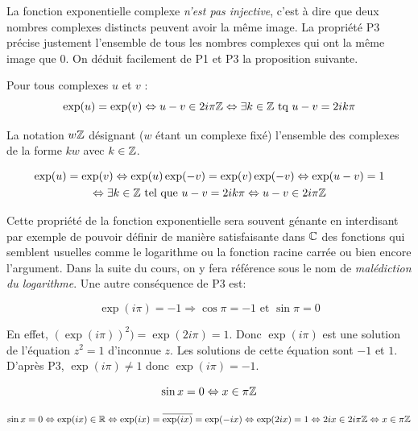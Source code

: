 La fonction exponentielle complexe \emph{n'est pas injective}, c'est à dire que deux nombres complexes distincts peuvent avoir la même image. La propriété P3 précise justement l'ensemble de tous les nombres complexes qui ont la même image que $0$. On déduit facilement de P1 et P3 la proposition suivante. 
\begin{propn}
Pour tous complexes $u$ et $v$ :
\begin{displaymath}
 \exp(u) = \exp (v) \Leftrightarrow u-v \in 2i\pi \mathbb{Z} 
 \Leftrightarrow \exists k \in \mathbb{Z} \text{ tq } u -v = 2ik\pi
\end{displaymath}
\end{propn}
La notation $w\mathbb{Z}$ désignant ($w$ étant un complexe fixé) l'ensemble des complexes de la forme $kw$ avec $k\in \mathbb{Z}$. 
\begin{demo}
\begin{multline*}
 \exp(u) = \exp (v) \Leftrightarrow \exp(u) \exp (-v) = \exp (v) \exp (-v) \Leftrightarrow \exp(u-v) = 1 \\
\Leftrightarrow \exists k \in \mathbb{Z} \text{ tel que } u-v = 2ik\pi \Leftrightarrow u-v \in 2i\pi \mathbb{Z}
\end{multline*}  
\end{demo}

Cette propriété de la fonction exponentielle sera souvent génante en interdisant par exemple de pouvoir définir de manière satisfaisante dans $\mathbb{C}$ des fonctions qui semblent usuelles comme le logarithme ou la fonction racine carrée ou bien encore l'argument. Dans la suite du cours, on y fera référence sous le nom de \emph{malédiction du logarithme}.\newline
Une autre conséquence de P3 est:
\begin{propn}
\begin{displaymath}
 \exp(i\pi)=-1 \Rightarrow \cos \pi = -1 \text{ et } \sin \pi = 0
\end{displaymath}
\end{propn}
\begin{demo}
En effet, $(\exp(i\pi))^2)=\exp(2i\pi)=1$. Donc $\exp(i\pi)$ est une solution de l'équation $z^2=1$ d'inconnue $z$. Les solutions de cette équation sont $-1$ et $1$. D'après P3, $\exp(i\pi)\neq 1$ donc $\exp(i\pi)=-1$.
\end{demo}

\begin{propn}\label{zerosin}
\begin{displaymath}
 \sin x = 0 \Leftrightarrow x\in \pi \mathbb{Z}
\end{displaymath}
\end{propn}
\begin{demo}
\begin{displaymath}
 \sin x = 0 \Leftrightarrow \exp(ix)\in \mathbb{R} \Leftrightarrow \exp(ix)=\overline{\exp(ix)}=\exp(-ix)
\Leftrightarrow \exp(2ix)=1\Leftrightarrow 2ix\in 2i\pi\mathbb{Z}
\Leftrightarrow x\in \pi \mathbb{Z}
\end{displaymath}
\end{demo}

